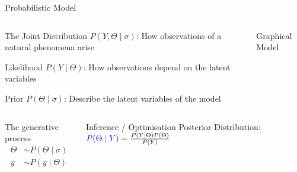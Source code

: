 \begin{frame}[t]{Probabilistic Model}


    \begin{columns}[t]
    \begin{column}{0.8\textwidth}
    \begin{block}{The Joint Distribution}
        $P(Y,\Theta \mid\sigma)$: How observations of a natural phenomena arise
    \end{block}

    \begin{block}{Likelihood}
        $P(Y \mid \Theta)$: How observations depend on the latent variables
    \end{block}

    \begin{block}{Prior}
        $P(\Theta \mid\sigma)$: Describe the latent variables of the model
    \end{block}

    \end{column}
    \begin{column}{0.25\textwidth}

        \begin{block}{Graphical Model}
            \centering

        \end{block}
    \end{column}
    \end{columns}

    \pause

    \begin{columns}[t]
        \begin{column}{0.35\textwidth}
        \begin{block}{The generative process}
            \begin{align*}
                \Theta &\sim P(\Theta \mid \sigma) \\
                y &\sim P(y \mid\Theta)
            \end{align*}
        \end{block}
        \end{column}
        \begin{column}{0.65\textwidth}
        \begin{block}{Inference / Optimisation}
            Posterior Distribution: $\textcolor{blue}{P(\Theta \mid Y)}  = \frac{P(Y|\Theta)P(\Theta)}{P(Y)}$
        \end{block}
        \end{column}
    \end{columns}

\end{frame}


